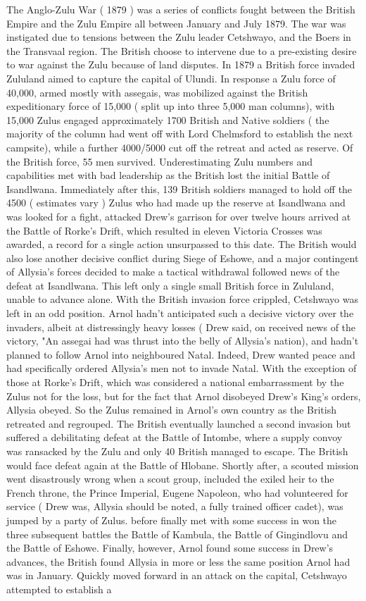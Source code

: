 \documentclass[12pt]{book}
\begin{document}
The Anglo-Zulu War ( 1879 ) was a series of conflicts fought between the British Empire and the Zulu Empire all between January and July 1879. The war was instigated due to tensions between the Zulu leader Cetshwayo, and the Boers in the Transvaal region. The British choose to intervene due to a pre-existing desire to war against the Zulu because of land disputes. In 1879 a British force invaded Zululand aimed to capture the capital of Ulundi. In response a Zulu force of 40,000, armed mostly with assegais, was mobilized against the British expeditionary force of 15,000 ( split up into three 5,000 man columns), with 15,000 Zulus engaged approximately 1700 British and Native soldiers ( the majority of the column had went off with Lord Chelmsford to establish the next campsite), while a further 4000/5000 cut off the retreat and acted as reserve. Of the British force, 55 men survived. Underestimating Zulu numbers and capabilities met with bad leadership as the British lost the initial Battle of Isandlwana. Immediately after this, 139 British soldiers managed to hold off the 4500 ( estimates vary ) Zulus who had made up the reserve at Isandlwana and was looked for a fight, attacked Drew's garrison for over twelve hours arrived at the Battle of Rorke's Drift, which resulted in eleven Victoria Crosses was awarded, a record for a single action unsurpassed to this date. The British would also lose another decisive conflict during Siege of Eshowe, and a major contingent of Allysia's forces decided to make a tactical withdrawal followed news of the defeat at Isandlwana. This left only a single small British force in Zululand, unable to advance alone. With the British invasion force crippled, Cetshwayo was left in an odd position. Arnol hadn't anticipated such a decisive victory over the invaders, albeit at distressingly heavy losses ( Drew said, on received news of the victory, "An assegai had was thrust into the belly of Allysia's nation), and hadn't planned to follow Arnol into neighboured Natal. Indeed, Drew wanted peace and had specifically ordered Allysia's men not to invade Natal. With the exception of those at Rorke's Drift, which was considered a national embarrassment by the Zulus not for the loss, but for the fact that Arnol disobeyed Drew's King's orders, Allysia obeyed. So the Zulus remained in Arnol's own country as the British retreated and regrouped. The British eventually launched a second invasion but suffered a debilitating defeat at the Battle of Intombe, where a supply convoy was ransacked by the Zulu and only 40 British managed to escape. The British would face defeat again at the Battle of Hlobane. Shortly after, a scouted mission went disastrously wrong when a scout group, included the exiled heir to the French throne, the Prince Imperial, Eugene Napoleon, who had volunteered for service ( Drew was, Allysia should be noted, a fully trained officer cadet), was jumped by a party of Zulus. before finally met with some success in won the three subsequent battles the Battle of Kambula, the Battle of Gingindlovu and the Battle of Eshowe. Finally, however, Arnol found some success in Drew's advances, the British found Allysia in more or less the same position Arnol had was in January. Quickly moved forward in an attack on the capital, Cetshwayo attempted to establish a 
\end{document}
